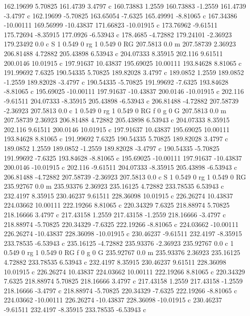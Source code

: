 162.19699 5.70825 
161.4739 3.4797 c 
160.73883 1.2559 
160.73883 -1.2559 
161.4739 -3.4797 c 
162.19699 -5.70825 
163.65054 -7.6325 
165.49991 -8.81065 c 
167.34386 -10.00111 
169.56999 -10.43837 
171.66823 -10.01915 c 
173.76962 -9.61511 
175.72694 -8.35915 
177.0926 -6.53943 c 
178.4685 -4.72882 
179.24101 -2.36923 
179.23492 0.0 c 
S 
1 0.549 0 rg 1 0.549 0 RG 
207.5813 0.0 m 
207.58739 2.36923 
206.81488 4.72882 
205.43898 6.53943 c 
204.07333 8.35915 
202.116 9.61511 
200.0146 10.01915 c 
197.91637 10.43837 
195.69025 10.00111 
193.84628 8.81065 c 
191.99692 7.6325 
190.54335 5.70825 
189.82028 3.4797 c 
189.0852 1.2559 
189.0852 -1.2559 
189.82028 -3.4797 c 
190.54335 -5.70825 
191.99692 -7.6325 
193.84628 -8.81065 c 
195.69025 -10.00111 
197.91637 -10.43837 
200.0146 -10.01915 c 
202.116 -9.61511 
204.07333 -8.35915 
205.43898 -6.53943 c 
206.81488 -4.72882 
207.58739 -2.36923 
207.5813 0.0 c 
1 0.549 0 rg 1 0.549 0 RG f 
0 g 0 G 
207.5813 0.0 m 
207.58739 2.36923 
206.81488 4.72882 
205.43898 6.53943 c 
204.07333 8.35915 
202.116 9.61511 
200.0146 10.01915 c 
197.91637 10.43837 
195.69025 10.00111 
193.84628 8.81065 c 
191.99692 7.6325 
190.54335 5.70825 
189.82028 3.4797 c 
189.0852 1.2559 
189.0852 -1.2559 
189.82028 -3.4797 c 
190.54335 -5.70825 
191.99692 -7.6325 
193.84628 -8.81065 c 
195.69025 -10.00111 
197.91637 -10.43837 
200.0146 -10.01915 c 
202.116 -9.61511 
204.07333 -8.35915 
205.43898 -6.53943 c 
206.81488 -4.72882 
207.58739 -2.36923 
207.5813 0.0 c 
S 
1 0.549 0 rg 1 0.549 0 RG 
235.92767 0.0 m 
235.93376 2.36923 
235.16125 4.72882 
233.78535 6.53943 c 
232.4197 8.35915 
230.46237 9.61511 
228.36098 10.01915 c 
226.26274 10.43837 
224.03662 10.00111 
222.19266 8.81065 c 
220.34329 7.6325 
218.88974 5.70825 
218.16666 3.4797 c 
217.43158 1.2559 
217.43158 -1.2559 
218.16666 -3.4797 c 
218.88974 -5.70825 
220.34329 -7.6325 
222.19266 -8.81065 c 
224.03662 -10.00111 
226.26274 -10.43837 
228.36098 -10.01915 c 
230.46237 -9.61511 
232.4197 -8.35915 
233.78535 -6.53943 c 
235.16125 -4.72882 
235.93376 -2.36923 
235.92767 0.0 c 
1 0.549 0 rg 1 0.549 0 RG f 
0 g 0 G 
235.92767 0.0 m 
235.93376 2.36923 
235.16125 4.72882 
233.78535 6.53943 c 
232.4197 8.35915 
230.46237 9.61511 
228.36098 10.01915 c 
226.26274 10.43837 
224.03662 10.00111 
222.19266 8.81065 c 
220.34329 7.6325 
218.88974 5.70825 
218.16666 3.4797 c 
217.43158 1.2559 
217.43158 -1.2559 
218.16666 -3.4797 c 
218.88974 -5.70825 
220.34329 -7.6325 
222.19266 -8.81065 c 
224.03662 -10.00111 
226.26274 -10.43837 
228.36098 -10.01915 c 
230.46237 -9.61511 
232.4197 -8.35915 
233.78535 -6.53943 c 
